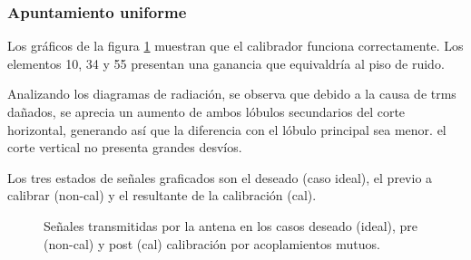 \subsubsection{Apuntamiento uniforme}

Los gráficos de la figura \ref{fig:deadTRMsMutual0deg} muestran que el calibrador funciona correctamente. Los elementos 10, 
34 y 55 presentan una ganancia que equivaldría al piso de ruido.

Analizando los diagramas de radiación, se observa que debido a la causa de trms dañados, se aprecia un aumento de
ambos lóbulos secundarios del corte horizontal, generando así que la diferencia con el lóbulo principal sea menor. el corte
vertical no presenta grandes desvíos.

Los tres estados de señales graficados son el deseado (caso ideal), el previo a calibrar (non-cal) y el resultante de la
calibración (cal). 
\begin{figure}[H]
	\centering

	\caption{Señales transmitidas por la antena en los casos deseado (ideal), pre (non-cal) y post (cal) calibración por acoplamientos mutuos.}
	\label{fig:deadTRMsMutual0deg}
\end{figure}
